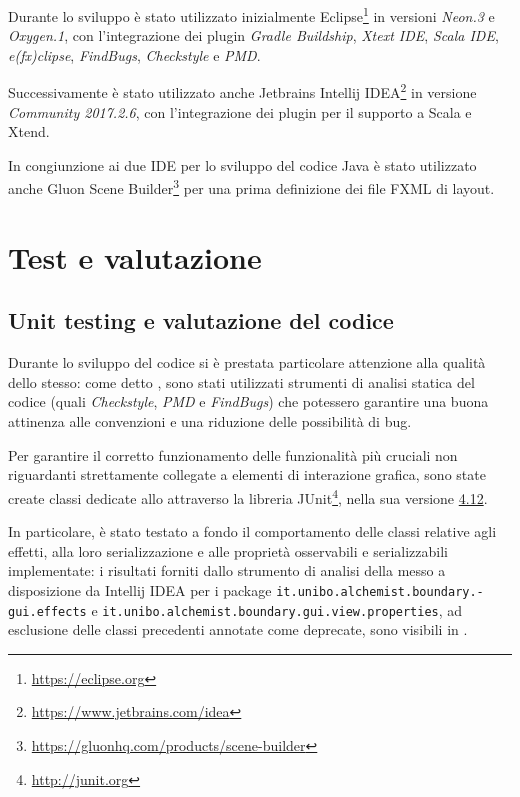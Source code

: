                 Durante lo sviluppo è stato utilizzato inizialmente Eclipse\footnote{\url{https://eclipse.org}} in versioni \textit{Neon.3} e \textit{Oxygen.1}, con l'integrazione dei plugin \emph{Gradle Buildship}, \emph{Xtext IDE}, \emph{Scala IDE}, \emph{e(fx)clipse}, \emph{FindBugs}, \emph{Checkstyle} e \emph{PMD}.

                Successivamente è stato utilizzato anche Jetbrains Intellij IDEA\footnote{\url{https://www.jetbrains.com/idea}} in versione \textit{Community 2017.2.6}, con l'integrazione dei plugin per il supporto a Scala e Xtend.

                In congiunzione ai due IDE per lo sviluppo del codice Java è stato utilizzato anche Gluon Scene Builder\footnote{\url{https://gluonhq.com/products/scene-builder}} per una prima definizione dei file FXML di layout.

        \section{Test e valutazione}\label{sec:test}
            \subsection{Unit testing e valutazione del codice}
                Durante lo sviluppo del codice si è prestata particolare attenzione alla qualità dello stesso: come detto , sono stati utilizzati strumenti di analisi statica del codice (quali \emph{Checkstyle}, \emph{PMD} e \emph{FindBugs}) che potessero garantire una buona attinenza alle convenzioni e una riduzione delle possibilità di bug.

                Per garantire il corretto funzionamento delle funzionalità più cruciali non riguardanti strettamente collegate a elementi di interazione grafica, sono state create classi dedicate allo  attraverso la libreria JUnit\footnote{\url{http://junit.org}}, nella sua versione \href{http://junit.org/junit4/}{4.12}.

                In particolare, è stato testato a fondo il comportamento delle classi relative agli effetti, alla loro serializzazione e alle proprietà osservabili e serializzabili implementate: i risultati forniti dallo strumento di analisi della  messo a disposizione da Intellij IDEA per i package \texttt{it\dothyp unibo\dothyp alchemist\dothyp boundary\dothyp gui\dothyp effects} e \texttt{it\dothyp unibo\dothyp alchemist\dothyp boundary\dothyp gui\dothyp view\dothyp properties}, ad esclusione delle classi precedenti annotate come deprecate, sono visibili in .

